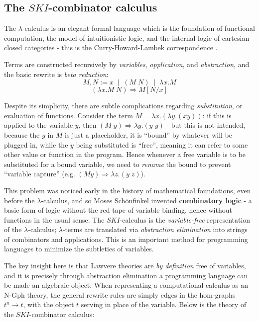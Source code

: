 \documentclass[a4paper,UKenglish]{article}
\theoremstyle{definition}
\newcommand{\Gph}{\mathrm{Gph}}
\newcommand{\NN}{\mathrm{N}}
\begin{document}
\subsection{The $SKI$-combinator calculus}
The $\lambda$-calculus is an elegant formal language which is the foundation of functional computation, the model of intuitionistic logic, and the internal logic of cartesian closed categories - this is the Curry-Howard-Lambek correspondence \cite{rosetta}.

Terms are constructed recursively by \textit{variables}, \textit{application}, and \textit{abstraction}, and the basic rewrite is \textit{beta reduction}: $$M,N := x \;\; | \;\; (M\; N) \;\; | \;\; \lambda x.M$$ $$(\lambda x.M\; N) \Rightarrow M[N/x]$$

Despite its simplicity, there are subtle complications regarding \textit{substitution}, or evaluation of functions. Consider the term $M = \lambda x.(\lambda y.(xy))$: if this is applied to the variable $y$, then $(M\; y) \Rightarrow \lambda y.(y\; y)$ - but this is not intended, because the $y$ in $M$ is just a placeholder, it is ``bound'' by whatever will be plugged in, while the $y$ being substituted is ``free'', meaning it can refer to some other value or function in the program. Hence whenever a free variable is to be substituted for a bound variable, we need to \textit{rename} the bound to prevent ``variable capture'' (e.g. $(M y) \Rightarrow \lambda z.(y\; z)$).

This problem was noticed early in the history of mathematical foundations, even before the $\lambda$-calculus, and so Moses Sch\"onfinkel invented \textbf{combinatory logic} \cite{combs} - a basic form of logic without the red tape of variable binding, hence without functions in the usual sense. The $SKI$-calculus is the \textit{variable-free} representation of the $\lambda$-calculus; $\lambda$-terms are translated via \textit{abstraction elimination} into strings of combinators and applications. This is an important method for programming languages to minimize the subtleties of variables.

The key insight here is that Lawvere theories are \textit{by definition} free of variables, and it is precisely through abstraction elimination a programming language can be made an algebraic object. When representing a computational calculus as an $\NN$-$\Gph$ theory, the general rewrite rules are simply edges in the hom-graphs $t^n \to t$, with the object $t$ serving in place of the variable. Below is the theory of the $SKI$-combinator calculus:
\end{document}
